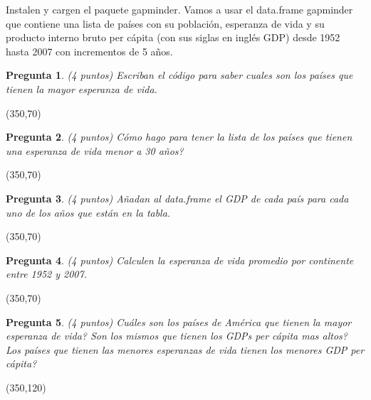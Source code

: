 \documentclass{article}
\newtheorem{pregunta}{Pregunta}
\begin{document}
Instalen y cargen el paquete gapminder. Vamos a usar el data.frame gapminder que contiene una lista de pa\'ises con su población, esperanza de vida y su producto interno bruto per c\'apita (con sus siglas en ingl\'es GDP) desde 1952 hasta 2007 con incrementos de 5 a\~nos.
\begin{pregunta} (4 puntos)
Escriban el c\'odigo para saber cuales son los pa\'ises que tienen la mayor esperanza de vida.
\end{pregunta}
\framebox(350,70){} \\
\par
\begin{pregunta} (4 puntos)
C\'omo hago para tener la lista de los pa\'ises que tienen una esperanza de vida menor a 30 a\~nos?
\end{pregunta}
\framebox(350,70){} \\
\par
\begin{pregunta} (4 puntos)
A\~nadan al data.frame el GDP de cada pa\'is para cada uno de los a\~nos que est\'an en la tabla.
\end{pregunta}
\framebox(350,70){} \\
\par
\begin{pregunta} (4 puntos)
Calculen la esperanza de vida promedio por continente entre 1952 y 2007.
\end{pregunta}
\framebox(350,70){} \\
\par
\begin{pregunta} (4 puntos)
Cu\'ales son los pa\'ises de Am\'erica que tienen la mayor esperanza de vida? Son los mismos que tienen los GDPs per c\'apita mas altos? Los pa\'ises que tienen las menores esperanzas de vida tienen los menores GDP per c\'apita?
\end{pregunta}
\framebox(350,120){} \\
\par
\end{document}
